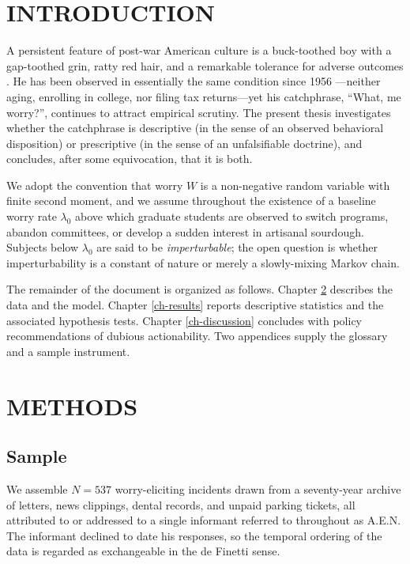 \documentclass{cpthesis}
\begin{document}
\pagestyle{plain}
\chapter{INTRODUCTION}\label{ch-intro}

A persistent feature of post-war American culture is a buck-toothed
boy with a gap-toothed grin, ratty red hair, and a remarkable
tolerance for adverse outcomes \citep{reidelbach1991completely}. He
has been observed in essentially the same condition since 1956
\citep{neuman1956what}---neither aging, enrolling in college, nor
filing tax returns---yet his catchphrase, ``What, me worry?'',
continues to attract empirical scrutiny. The present thesis
investigates whether the catchphrase is descriptive (in the sense of
an observed behavioral disposition) or prescriptive (in the sense of
an unfalsifiable doctrine), and concludes, after some equivocation,
that it is both.

We adopt the convention that worry $W$ is a non-negative random
variable with finite second moment, and we assume throughout the
existence of a baseline worry rate $\lambda_0$ above which graduate
students are observed to switch programs, abandon committees, or
develop a sudden interest in artisanal sourdough. Subjects below
$\lambda_0$ are said to be \textit{imperturbable}; the open question
is whether imperturbability is a constant of nature or merely a
slowly-mixing Markov chain.

The remainder of the document is organized as follows. Chapter
\ref{ch-methods} describes the data and the model. Chapter
\ref{ch-results} reports descriptive statistics and the associated
hypothesis tests. Chapter \ref{ch-discussion} concludes with policy
recommendations of dubious actionability. Two appendices supply the
glossary and a sample instrument.

\chapter{METHODS}\label{ch-methods}

\section{Sample}

We assemble $N = 537$ worry-eliciting incidents drawn from a
seventy-year archive of letters, news clippings, dental records, and
unpaid parking tickets, all attributed to or addressed to a single
informant referred to throughout as A.E.N. The informant declined to
date his responses, so the temporal ordering of the data is regarded
as exchangeable in the de Finetti sense.
\end{document}
